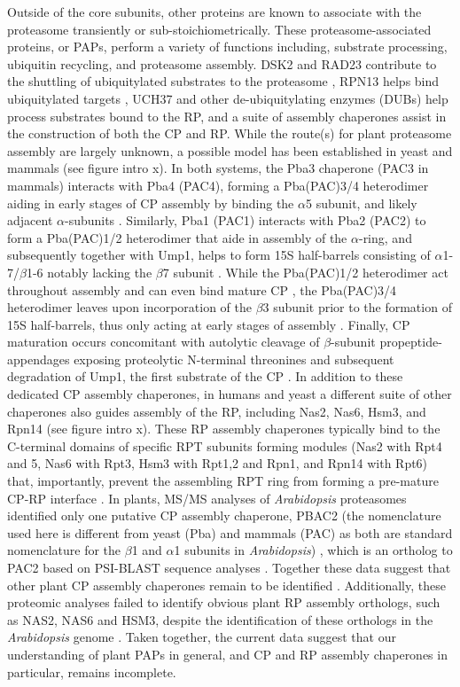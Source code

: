 Outside of the core subunits, other proteins are known to associate with the proteasome transiently or sub-stoichiometrically. These proteasome-associated proteins, or PAPs, perform a variety of functions including, substrate processing, ubiquitin recycling, and proteasome assembly. DSK2 and RAD23 contribute to the shuttling of ubiquitylated substrates to the proteasome \citep{farmer10, fatimababy10, lin11}, RPN13 helps bind ubiquitylated targets \citep{schreiner08}, UCH37 and other de-ubiquitylating enzymes (DUBs) \citep{vanderlinden15} help process substrates bound to the RP, and a suite of assembly chaperones assist in the construction of both the CP and RP.  While the route(s) for plant proteasome assembly are largely unknown, a possible model has been established in yeast and mammals (see figure intro x). In both systems, the Pba3 chaperone (PAC3 in mammals) interacts with Pba4 (PAC4), forming a Pba(PAC)3/4 heterodimer aiding in early stages of CP assembly by binding the $\alpha$5 subunit, and likely adjacent $\alpha$-subunits  \citep{kunjappu14, yashiroda08}. Similarly, Pba1 (PAC1) interacts with Pba2 (PAC2) to form a Pba(PAC)1/2 heterodimer that aide in assembly of the $\alpha$-ring, and subsequently together with Ump1, helps to form 15S half-barrels consisting of $\alpha$1-7/$\beta$1-6 notably lacking the $\beta$7 subunit \citep{kunjappu14, marques07}. While the Pba(PAC)1/2 heterodimer act throughout assembly and can even bind mature CP , the Pba(PAC)3/4 heterodimer leaves upon incorporation of the $\beta$3 subunit prior to the formation of 15S half-barrels, thus only acting at early stages of assembly . Finally, CP maturation occurs concomitant with autolytic cleavage of $\beta$-subunit propeptide-appendages exposing proteolytic N-terminal threonines and subsequent degradation of Ump1, the first substrate of the CP \citep{ramos98}. In addition to these dedicated CP assembly chaperones, in humans and yeast a different suite of other chaperones also guides assembly of the RP, including Nas2, Nas6, Hsm3, and Rpn14 (see figure intro x). These RP assembly chaperones typically bind to the C-terminal domains of specific RPT subunits forming modules (Nas2 with Rpt4 and 5, Nas6 with Rpt3, Hsm3 with Rpt1,2 and Rpn1, and Rpn14 with Rpt6) that, importantly, prevent the assembling RPT ring from forming a pre-mature CP-RP interface \citep{park10}.  In plants, MS/MS analyses of \textit{Arabidopsis} proteasomes identified only one putative CP assembly chaperone, PBAC2 (the nomenclature used here is different from yeast (Pba) and mammals (PAC) as both are standard nomenclature for the $\beta$1 and $\alpha$1 subunits in \textit{Arabidopsis}) \citep{book10}, which is an ortholog to PAC2 based on PSI-BLAST sequence analyses \citep{kusmierczyk11, le07}. Together these data suggest that other plant CP assembly chaperones remain to be identified \citep{book10}.  Additionally, these proteomic analyses failed to identify obvious plant RP assembly orthologs, such as NAS2, NAS6 and HSM3, despite the identification of these orthologs in the \textit{Arabidopsis} genome \citep{book10}. Taken together, the current data suggest that our understanding of plant PAPs in general, and CP and RP assembly chaperones in particular, remains incomplete.


